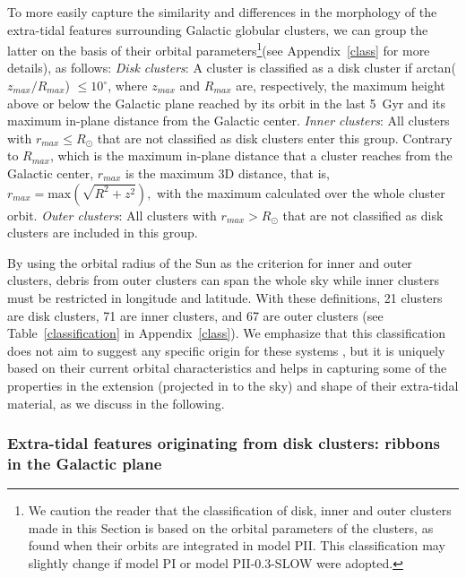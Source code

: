         To more easily capture the similarity and differences in the morphology of the extra-tidal features surrounding Galactic globular clusters, we can group the latter on the basis of their orbital parameters\footnote{We caution the reader that the classification of disk, inner and outer clusters made in this Section is based on the orbital parameters of the clusters, as found when their orbits are integrated in model PII. This classification may slightly change if model PI or model PII-0.3-SLOW were adopted.}(see Appendix~\ref{class} for more details), as follows: \emph{Disk clusters}: A cluster is classified as a disk cluster if arctan($z_{max}/R_{max}$) $\le 10^\circ$, where $z_{max}$ and $R_{max}$ are, respectively, the maximum height above or below the Galactic plane reached by its orbit in the last 5~Gyr and its maximum in-plane distance from the Galactic center. \emph{Inner clusters}: All clusters with $r_{max} \le R_{\odot}$ that are not classified as disk clusters enter this group. Contrary to $R_{max}$, which is the maximum in-plane distance that a cluster reaches from the Galactic center, $r_{max}$ is the maximum 3D distance, that is, $r_{max} = \textrm{max}(\sqrt{R^2+z^2}),$ with the maximum calculated over the whole cluster orbit. \emph{Outer clusters}: All clusters with $r_{max} > R_{\odot}$ that are not classified as disk clusters are included in this group. 

        By using the orbital radius of the Sun as the criterion for inner and outer clusters, debris from outer clusters can span the whole sky while inner clusters must be restricted in longitude and latitude. With these definitions, 21 clusters are disk clusters, 71 are inner clusters, and 67 are outer clusters (see  Table~\ref{classification} in Appendix~\ref{class}). We emphasize that this classification does not aim to suggest any specific origin for these systems \citep[e.g., whether they are in-situ or accreted, see][]{massari19}, but it is uniquely based on their current orbital characteristics and helps in capturing some of the properties in the extension (projected in to the sky) and shape of their extra-tidal material, as we discuss in the following.

        \subsubsection{Extra-tidal features originating from disk clusters: ribbons in the Galactic plane}

